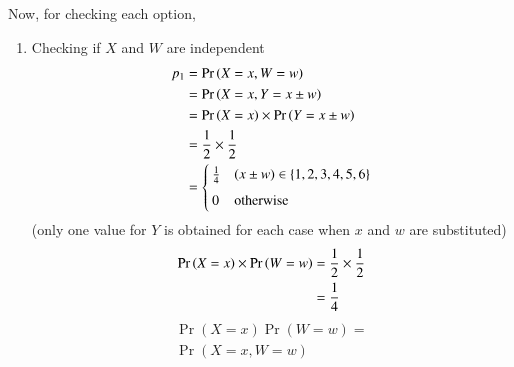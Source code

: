 \documentclass[journal,12pt,twocolumn]{IEEEtran}
\begin{document}
Now, for checking each option,
\begin{enumerate}
    \item Checking if $X$ and $W$ are independent
\begin{align}
    p_1 &= \Pr\left(X=x,W=w\right)\\
        &= \Pr\left(X=x,Y=x\pm w\right)\\
        &=\Pr\left(X=x\right)\times\Pr\left(Y=x\pm w\right)\\
        &= \frac{1}{2}\times\frac{1}{2}\\
        &= \begin{cases}
        \frac{1}{4} & (x\pm w) \in \{1, 2, 3, 4, 5, 6\}\\ ~\\[-1em]
        0 & \text{otherwise}
    \end{cases}
\end{align}
(only one value for $Y$ is obtained for each case when $x$ and $w$ are substituted)
\begin{align}
    \Pr\left(X=x\right)\times\Pr\left(W=w\right) &= \frac{1}{2} \times\frac{1}{2} \\
                           &= \frac{1}{4}
\end{align}
\begin{multline}
    \Pr{(X=x)}\Pr{(W=w)} =\\ \Pr{(X=x,W=w)}
\end{multline}


\end{enumerate}
\end{document}
